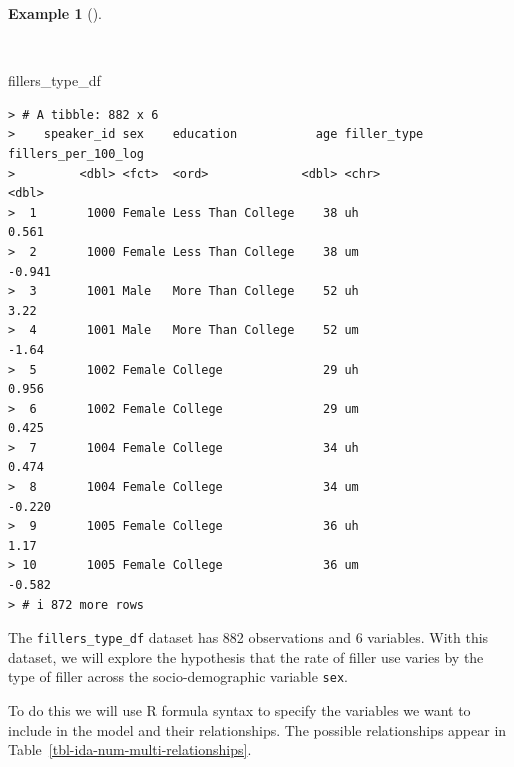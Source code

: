 \documentclass[
  letterpaper,
]{latex/krantz}
\newenvironment{Shaded}{\begin{snugshade}}{\end{snugshade}}
\newcommand{\NormalTok}[1]{\textcolor[rgb]{0.00,0.00,0.00}{#1}}
\theoremstyle{definition}
\newtheorem{example}{Example}[chapter]
\theoremstyle{remark}
\begin{document}
\begin{example}[]\protect\hypertarget{exm-ida-num-fillers-type-dataset}{}\label{exm-ida-num-fillers-type-dataset}

~

\begin{Shaded}
\begin{Highlighting}[]
\NormalTok{fillers\_type\_df}
\end{Highlighting}
\end{Shaded}

\begin{verbatim}
> # A tibble: 882 x 6
>    speaker_id sex    education           age filler_type fillers_per_100_log
>         <dbl> <fct>  <ord>             <dbl> <chr>                     <dbl>
>  1       1000 Female Less Than College    38 uh                        0.561
>  2       1000 Female Less Than College    38 um                       -0.941
>  3       1001 Male   More Than College    52 uh                        3.22 
>  4       1001 Male   More Than College    52 um                       -1.64 
>  5       1002 Female College              29 uh                        0.956
>  6       1002 Female College              29 um                        0.425
>  7       1004 Female College              34 uh                        0.474
>  8       1004 Female College              34 um                       -0.220
>  9       1005 Female College              36 uh                        1.17 
> 10       1005 Female College              36 um                       -0.582
> # i 872 more rows
\end{verbatim}

\end{example}

The \texttt{fillers\_type\_df} dataset has 882 observations and 6
variables. With this dataset, we will explore the hypothesis that the
rate of filler use varies by the type of filler across the
socio-demographic variable \texttt{sex}.

To do this we will use R formula syntax to specify the variables we want
to include in the model and their relationships. The possible
relationships appear in Table~\ref{tbl-ida-num-multi-relationships}.
\end{document}
